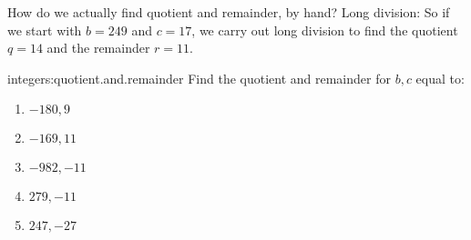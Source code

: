 \begin{example}
How do we actually find quotient and remainder, by hand?
Long division:
So if we start with \(b=249\) and \(c=17\), we carry out long division to find the quotient \(q=14\) and the remainder \(r=11\).
\end{example}
\begin{problem}{integers:quotient.and.remainder}
Find the quotient and remainder for \(b,c\) equal to:
\begin{enumerate}
\item \(-180, 9\)
\item \(-169, 11\)
\item \(-982, -11\)
\item \(279, -11\)
\item \(247, -27\)
\end{enumerate}
\end{problem}

